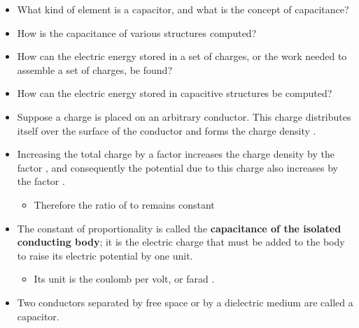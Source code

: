 \begin{ELunit}


\begin{itemize}
\item
  What kind of element is a capacitor, and what is the concept of capacitance?
\item
  How is the capacitance of various structures computed?
\item
  How can the electric energy stored in a set of charges, or the work needed to assemble a set of charges, be found?
\item
  How can the electric energy stored in capacitive structures be computed?
\item
  Suppose a charge  is placed on an arbitrary conductor. This charge distributes itself over the surface of the conductor and forms the charge density .
\item
  Increasing the total charge by a factor  increases the charge density  by the factor , and consequently the potential due to this charge also increases by the factor .

  \begin{itemize}
  \tightlist
  \item
    Therefore the ratio of  to  remains constant
  \end{itemize}
\end{itemize}

\end{ELunit}

\begin{ELimportant}{}


\end{ELimportant}

\begin{ELunit}

\begin{itemize}
\tightlist
\item
  The constant of proportionality  is called the \textbf{capacitance of the isolated conducting body}; it is the electric charge that must be added to the body to raise its electric potential by one unit.

  \begin{itemize}
  \tightlist
  \item
    Its unit is the coulomb per volt, or farad .
  \end{itemize}
\item
  Two conductors separated by free space or by a dielectric medium are called a capacitor.
\end{itemize}


\end{ELunit}

